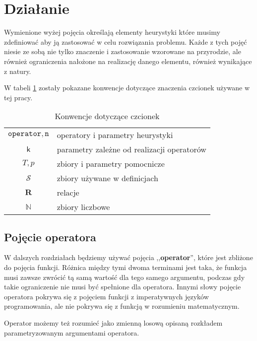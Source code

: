 \documentclass[twoside]{iisthesis}
\newcommand{\numberSet}[1]{\mathbb{#1}}
\newcommand{\important}[1]{\mathcal{#1}}
\newcommand{\R}{\mathbf{R}}
\newcommand{\param}[1]{\mathtt{#1}}
\newcommand{\variable}[1]{\mathsf{#1}}
\begin{document}
\section{Działanie}

Wymienione wyżej pojęcia określają elementy heurystyki które musimy zdefiniować aby ją zastosować w celu rozwiązania problemu. Każde z tych pojęć niesie ze sobą nie tylko znaczenie i zastosowanie wzorowane na przyrodzie, ale również ograniczenia nałożone na realizację danego elementu, również wynikające z natury.

W tabeli \ref{table:signature_conventions} zostały pokazane konwencje dotyczące znaczenia czcionek używane w tej pracy.


\begin{table}
	\caption{Konwencje dotyczące czcionek \label{table:signature_conventions}}
	\centering
	\begin{tabular}{cl}
		$\param{operator}, \param{n}$ & operatory i parametry heurystyki \\
		$\variable{k}$ & parametry zależne od realizacji operatorów \\
		$T, p$ & zbiory i parametry pomocnicze \\
		$\important{S}$ & zbiory używane w definicjach \\
		$\R$ & relacje \\
		$\numberSet{N}$ & zbiory liczbowe
	\end{tabular}
\end{table}

\subsection{Pojęcie operatora} \label{subsection:operator}

W dalszych rozdziałach będziemy używać pojęcia ,,\textbf{operator}'', które jest zbliżone do pojęcia funkcji. Różnica między tymi dwoma terminami jest taka, że funkcja musi zawsze zwrócić tą samą wartość dla tego samego argumentu, podczas gdy takie ograniczenie nie musi być spełnione dla operatora. Innymi słowy pojęcie operatora pokrywa się z pojęciem funkcji z imperatywnych języków programowania, ale nie pokrywa się z funkcją w rozumieniu matematycznym.

Operator możemy też rozumieć jako zmienną losową opisaną rozkładem parametryzowanym argumentami operatora.
\end{document}
